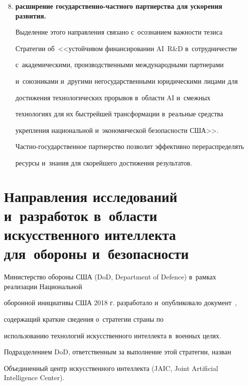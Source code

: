 \begin{enumerate}[(1)]


\setcounter{enumi}{7}


\item 


\textbf{расширение го\-су\-дар\-ст\-вен\-но-част\-но\-го партнерства для ускорения развития.}


  Выделение этого направления связано с~осознанием важности тезиса


Стратегии об~<<устойчивом финансировании AI~R\&D в~сотрудничестве


с~академическими, производственными международными партнерами


и~союзниками и~другими негосударственными юридическими лицами для


достижения технологических прорывов в~об\-ласти AI и~смежных


технологиях для их быстрейшей трансформации в~реальные средства


укрепления национальной и~экономической безопас\-ности США>>.


Част\-но-го\-су\-дар\-ст\-вен\-ное партнерство позволит эффективно перераспределять


ресурсы и~знания для скорейшего достижения результатов.


  \end{enumerate}





\section{Направления исследований и~разработок в~области искусственного интеллекта для~обороны и~безопасности} %





  Министерство обороны США (DoD, Department of Defence) в~рамках реализации Национальной


оборонной инициативы США 2018 г. разработало и~опубликовало документ~\cite{13-bor}, 


содержащий краткие сведения о~стратегии страны по


использованию технологий искусственного интеллекта в~военных целях.


Подразделением DoD, ответственным за выполнение этой стратегии, назван


Объединенный центр искусственного интеллекта (JAIC, Joint Artificial Intelligence Center). 


